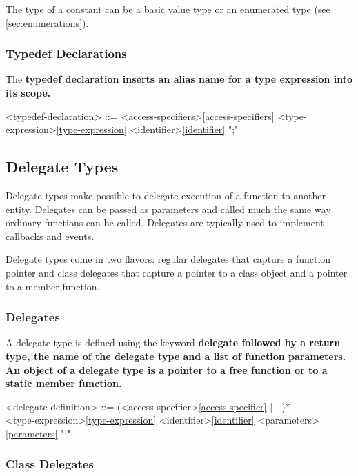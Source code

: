 \documentclass[a4paper,oneside,11pt]{article}
\begin{document}
The type of a constant can be a basic value type or an enumerated type (see \ref{sec:enumerations}).

\subsubsection{Typedef Declarations}

The \bf{typedef} declaration inserts an alias name for a type expression into its scope.

\begin{grammar}
\label{typedef-declaration}<typedef-declaration> ::= <access-specifiers>\ref{access-specifiers}  <type-expression>\ref{type-expression} <identifier>\ref{identifier} ";"
\end{grammar}

\subsection{Delegate Types}

Delegate types make possible to delegate execution of a function to another entity.
Delegates can be passed as parameters and called much the same way ordinary functions can be called.
Delegates are typically used to implement callbacks and events.

Delegate types come in two flavors: regular delegates that capture a function pointer and
class delegates that capture a pointer to a class object and a pointer to a member function.

\subsubsection{Delegates}

A delegate type is defined using the keyword \bf{delegate} followed by a return type, the name of the delegate type and a
list of function parameters.
An object of a delegate type is a pointer to a free function or to a static member function.

\begin{grammar}
\label{delegate-definition}<delegate-definition> ::= (<access-specifier>\ref{access-specifier} |  | )* \\
<type-expression>\ref{type-expression} <identifier>\ref{identifier} <parameters>\ref{parameters} ";"
\end{grammar}

\subsubsection{Class Delegates}
\end{document}
